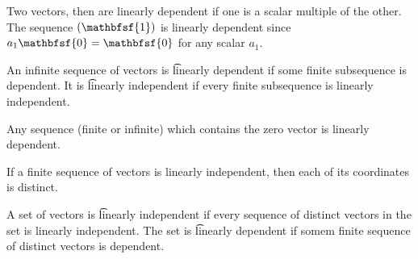 Two vectors, then are linearly dependent if one is a scalar multiple of the other.
The sequence $(\mathbfsf{1})$ is linearly dependent since $a_1 \mathbfsf{0} = \mathbfsf{0}$ for any scalar $a_1$.

An infinite sequence of vectors is \t{linearly dependent} if some finite subsequence is dependent.
It is \t{linearly independent} if every finite subsequence is linearly independent.

Any sequence (finite or infinite) which contains the zero vector is linearly dependent.

If a finite sequence of vectors is linearly independent, then each of its coordinates is distinct.

A set of vectors is \t{linearly independent} if every sequence of distinct vectors in the set is linearly independent.
The set is \t{linearly dependent} if somem finite sequence of distinct vectors is dependent.
